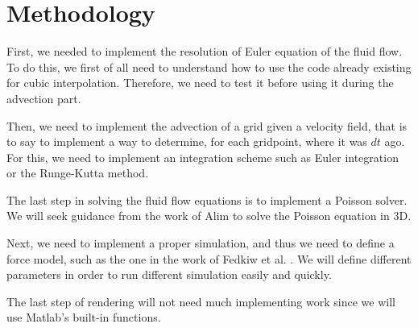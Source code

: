\documentclass[accepted,single]{gipaper}
\begin{document}



\section{Methodology}


First, we needed to implement the resolution of Euler equation of the fluid flow. To do this, we first of all need to understand how to use the code already existing for cubic interpolation. Therefore, we need to test it before using it during the advection part.

Then, we need to implement the advection of a grid given a velocity field, that is to say to implement a way to determine, for each gridpoint, where it was $dt$ ago. For this, we need to implement an integration scheme such as Euler integration or the Runge-Kutta method.

The last step in solving the fluid flow equations is to implement a Poisson solver. We will seek guidance from the work of Alim \cite{alim:ms} to solve the Poisson equation in 3D.

Next, we need to implement a proper simulation, and thus we need to define a force model, such as the one in the work of Fedkiw et al. \cite{Fedkiw:2001}. We will define different parameters in order to run different simulation easily and quickly.

The last step of rendering will not need much implementing work since we will use Matlab's built-in functions.

\end{document}

